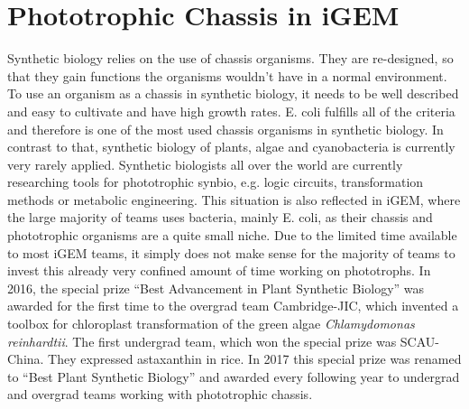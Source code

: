 \section{Phototrophic Chassis in iGEM}
Synthetic biology relies on the use of chassis organisms. They are re-designed, so that they gain functions the organisms wouldn’t have in a normal environment. To use an organism as a chassis in synthetic biology, it needs to be well described and easy to cultivate and have high growth rates. E. coli fulfills all of the criteria and therefore is one of the most used chassis organisms in synthetic biology. In contrast to that, synthetic biology of plants, algae and cyanobacteria is currently very rarely applied. Synthetic biologists all over the world are currently researching tools for phototrophic synbio, e.g. logic circuits, transformation methods or metabolic engineering.
\newline\newline
This situation is also reflected in iGEM, where the large majority of teams uses bacteria, mainly E. coli, as their chassis and phototrophic organisms are a quite small niche.
Due to the limited time available to most iGEM teams, it simply does not make sense for the majority of teams to invest this already very confined amount of time working on phototrophs.
\newline\newline
In 2016, the special prize “Best Advancement in Plant Synthetic Biology” was awarded for the first time to the overgrad team Cambridge-JIC, which invented a toolbox for chloroplast transformation of the green algae \textit{Chlamydomonas reinhardtii}. The first undergrad team, which won the special prize was SCAU-China. They expressed astaxanthin in rice. In 2017 this special prize was renamed to “Best Plant Synthetic Biology” and awarded every following year to undergrad and overgrad teams working with phototrophic chassis.


